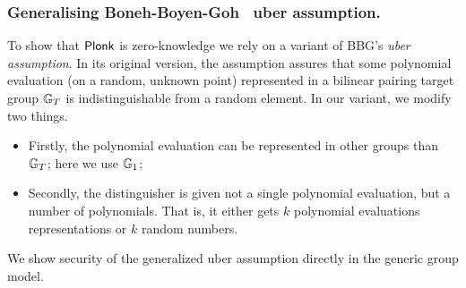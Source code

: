 \documentclass[runningheads,11pt]{llncs}
\theoremstyle{definition} \newtheorem{definition}[theorem]{Definition}
\begin{document}
\subsubsection{Generalising Boneh-Boyen-Goh~\cite{EC:BonBoyGoh05} uber assumption.}
To show that $\textnormal{\textsf{Plonk}}$ is zero-knowledge we rely on a variant of
BBG's \emph{uber assumption}. In its original version, the
assumption assures that some polynomial evaluation (on a random, unknown point)
represented in a bilinear pairing target group $\mathbb{G}_T$ is indistinguishable
from a random element. In our variant, we modify two things.
\begin{itemize}
\item Firstly, the polynomial evaluation can be represented in other groups
  than $\mathbb{G}_T$; here we use $\mathbb{G}_1$;
\item Secondly, the distinguisher is given not a single polynomial evaluation,
  but a number of polynomials. That is, it either gets $k$ polynomial
  evaluations representations or $k$ random numbers.
\end{itemize}
We show security of the generalized uber assumption directly in the generic
group model.



\end{document}
